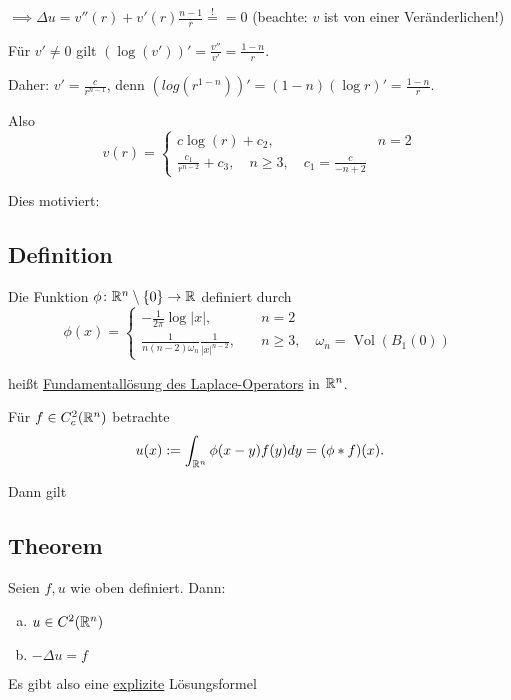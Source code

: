 $\implies \Delta u = v''(r) + v'(r) \frac{n - 1}{r} \overset{!}{=} = 0$ (beachte: $v$ ist von einer Veränderlichen!)

Für $v' \neq 0$ gilt $(\log(v'))' = \frac{v''}{v'} = \frac{1 - n}{r}$.

Daher: $v' = \frac{c}{r^{n - 1}}$, denn  $(log(r^{1 - n}))' = (1 - n)(\log r)' = \frac{ 1 - n}{r}$.

Also
$$
v(r) = \begin{cases} c \log(r) + c_2, \quad& n = 2 \\ \frac{c_1}{r^{n - 2}} + c_3, \quad n \geq 3, \quad c_1 = \frac{c}{-n + 2} \end{cases}
$$

Dies motiviert:

\subsection{Definition}

Die Funktion $\phi \colon \mathbb{R}^n \setminus \{0\} \to \mathbb{R}$ definiert durch
$$
\phi(x) = \begin{cases} -\frac{1}{2\pi} \log{|x|},  \quad & n = 2 \\ \frac{1}{n(n-2) \omega_n} \frac{1}{|x|^{n - 2}}, \quad & n\geq 3, \quad \omega_n = \operatorname{Vol}(B_1(0)) \end{cases}
$$

heißt \underline{Fundamentallösung des Laplace-Operators} in $\mathbb{R}^n$. 

Für $f \in C_c^2(\mathbb{R}^n)$ betrachte
$$
u(x) := \int_{\mathbb{R}^n} \phi(x - y)f(y) dy = (\phi \ast f)(x).
$$

Dann gilt

\subsection{Theorem}

Seien $f, u$ wie oben definiert. Dann: 
\begin{enumerate}[(a)]
  \item $u \in C^2(\mathbb{R}^n)$
  \item $-\Delta u = f$
\end{enumerate}

\begin{bem}
  Es gibt also eine \underline{explizite} Lösungsformel
\end{bem}

